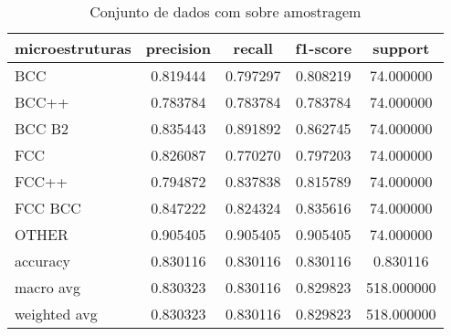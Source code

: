 \begin{table}[htb]
\centering
\caption{Conjunto de dados com sobre amostragem}
\begin{supertabular}{l|c|c|c|c}
\hline
{ microestruturas } & { precision } & { recall } & { f1-score } & { support }\\\hline
{ BCC } &           {0.819444} & {0.797297} & {0.808219} & {74.000000}\\\hline
{ BCC++ } &         {0.783784} & {0.783784} & {0.783784} & {74.000000}\\\hline
{ BCC B2 } &        {0.835443} & {0.891892} & {0.862745} & {74.000000}\\\hline
{ FCC } &           {0.826087} & {0.770270} & {0.797203} & {74.000000}\\\hline
{ FCC++ } &         {0.794872} & {0.837838} & {0.815789} & {74.000000}\\\hline
{ FCC BCC } &       {0.847222} & {0.824324} & {0.835616} & {74.000000}\\\hline
{ OTHER } &         {0.905405} & {0.905405} & {0.905405} & {74.000000}\\\hline
{ accuracy } &      {0.830116} & {0.830116} & {0.830116} & {0.830116}\\\hline
{ macro avg } &     {0.830323} & {0.830116} & {0.829823} & {518.000000}\\\hline
{ weighted avg } &  {0.830323} & {0.830116} & {0.829823} & {518.000000}\\\hline
\end{supertabular}
    \legend{}
    \label{table:relatorio_oversampled}
\end{table}



